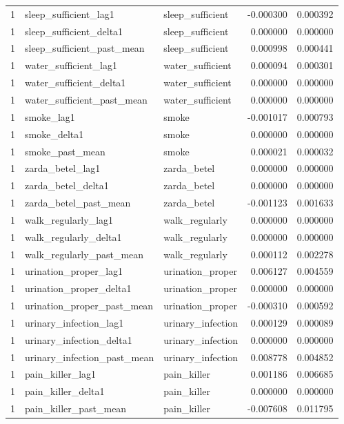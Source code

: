\begin{longtable}{rllrr}
1 & sleep\_sufficient\_lag1 & sleep\_sufficient & -0.000300 & 0.000392 \\
1 & sleep\_sufficient\_delta1 & sleep\_sufficient & 0.000000 & 0.000000 \\
1 & sleep\_sufficient\_past\_mean & sleep\_sufficient & 0.000998 & 0.000441 \\
1 & water\_sufficient\_lag1 & water\_sufficient & 0.000094 & 0.000301 \\
1 & water\_sufficient\_delta1 & water\_sufficient & 0.000000 & 0.000000 \\
1 & water\_sufficient\_past\_mean & water\_sufficient & 0.000000 & 0.000000 \\
1 & smoke\_lag1 & smoke & -0.001017 & 0.000793 \\
1 & smoke\_delta1 & smoke & 0.000000 & 0.000000 \\
1 & smoke\_past\_mean & smoke & 0.000021 & 0.000032 \\
1 & zarda\_betel\_lag1 & zarda\_betel & 0.000000 & 0.000000 \\
1 & zarda\_betel\_delta1 & zarda\_betel & 0.000000 & 0.000000 \\
1 & zarda\_betel\_past\_mean & zarda\_betel & -0.001123 & 0.001633 \\
1 & walk\_regularly\_lag1 & walk\_regularly & 0.000000 & 0.000000 \\
1 & walk\_regularly\_delta1 & walk\_regularly & 0.000000 & 0.000000 \\
1 & walk\_regularly\_past\_mean & walk\_regularly & 0.000112 & 0.002278 \\
1 & urination\_proper\_lag1 & urination\_proper & 0.006127 & 0.004559 \\
1 & urination\_proper\_delta1 & urination\_proper & 0.000000 & 0.000000 \\
1 & urination\_proper\_past\_mean & urination\_proper & -0.000310 & 0.000592 \\
1 & urinary\_infection\_lag1 & urinary\_infection & 0.000129 & 0.000089 \\
1 & urinary\_infection\_delta1 & urinary\_infection & 0.000000 & 0.000000 \\
1 & urinary\_infection\_past\_mean & urinary\_infection & 0.008778 & 0.004852 \\
1 & pain\_killer\_lag1 & pain\_killer & 0.001186 & 0.006685 \\
1 & pain\_killer\_delta1 & pain\_killer & 0.000000 & 0.000000 \\
1 & pain\_killer\_past\_mean & pain\_killer & -0.007608 & 0.011795 \\

\end{longtable}

